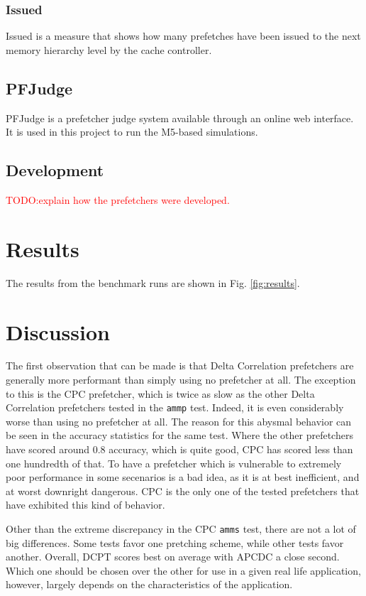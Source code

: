 \documentclass[a4paper]{IEEEtran}
\newcommand\TODO[1]{\textcolor{red}{TODO:#1}}
\newcommand\todo[1]{\TODO{#1}}
\begin{document}
\subsubsection{Issued}
Issued is a measure that shows how many prefetches have been issued to the next memory hierarchy level by the cache controller.

\subsection{PFJudge}

PFJudge is a prefetcher judge system available through an online web interface.
It is used in this project to run the M5-based simulations.

\subsection{Development}

\todo{explain how the prefetchers were developed.}

\section{Results}

The results from the benchmark runs are shown in Fig. \ref{fig:results}.

\section{Discussion}

The first observation that can be made is that Delta Correlation prefetchers are generally more performant than simply using no prefetcher at all.
The exception to this is the CPC prefetcher, which is twice as slow as the other Delta Correlation prefetchers tested in the \texttt{ammp} test.
Indeed, it is even considerably worse than using no prefetcher at all.
The reason for this abysmal behavior can be seen in the accuracy statistics for the same test.
Where the other prefetchers have scored around 0.8 accuracy, which is quite good, CPC has scored less than one hundredth of that.
To have a prefetcher which is vulnerable to extremely poor performance in some secenarios is a bad idea, as it is at best inefficient, and at worst downright dangerous.
CPC is the only one of the tested prefetchers that have exhibited this kind of behavior.

Other than the extreme discrepancy in the CPC \texttt{amms} test, there are not a lot of big differences.
Some tests favor one pretching scheme, while other tests favor another.
Overall, DCPT scores best on average with APCDC a close second.
Which one should be chosen over the other for use in a given real life application, however, largely depends on the characteristics of the application.
\end{document}
